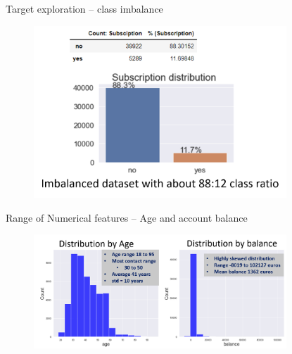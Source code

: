 \begin{frame}{Target exploration – class imbalance}


	\begin{figure}
		
		\includegraphics[width=9.50cm]{figures/fig_target_imbalance.png}
	\end{figure}


\end{frame}


\begin{frame}{Range of Numerical features – Age and account balance}


	\begin{figure}
		
		\includegraphics[width=9.50cm]{figures/fig_age_balance_count.png}
	\end{figure}


\end{frame}

